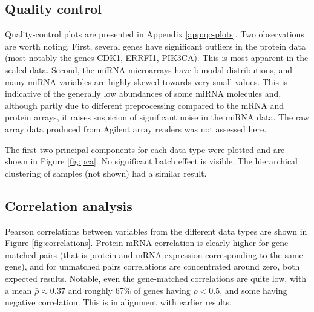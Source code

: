 \subsection{Quality control}

Quality-control plots are presented in Appendix \ref{app:qc-plots}. Two
observations are worth noting. First, several genes have significant outliers
in the protein data (most notably the genes CDK1, ERRFI1, PIK3CA). This is
most apparent in the scaled data. Second, the miRNA microarrays have bimodal
distributions, and many miRNA variables are highly skewed towards very small
values. This is indicative of the generally low abundances of some miRNA molecules
and, although partly due to different preprocessing compared to the mRNA and
protein arrays, it raises suspicion of significant noise in the miRNA data.
The raw array data produced from Agilent array readers was not assessed here.

The first two principal components for each data type were plotted and are
shown in Figure \ref{fig:pca}. No significant batch effect is visible. The
hierarchical clustering of samples (not shown) had a similar result.


\subsection{Correlation analysis}

Pearson correlations between variables from the different data types are shown in Figure
\ref{fig:correlations}. Protein-mRNA correlation is clearly higher for gene-matched pairs
(that is protein and mRNA expression corresponding to the same gene), and for
unmatched pairs correlations are concentrated around zero, both expected
results. Notable, even the gene-matched correlations are quite low, with a
mean $\bar{\rho} \approx 0.37$ and roughly 67\% of genes having $\rho < 0.5$, and
some having negative correlation. This is in alignment with earlier results. 

